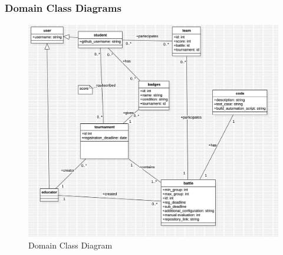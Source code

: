 \clearpage
\subsubsection{Domain Class Diagrams}
\begin{figure}
  \centering
  \includegraphics[width=1\textwidth]{RASD/2Overall_Description/res/ClassDiagram1 (1).jpg}
  \caption{Domain Class Diagram}
\end{figure}